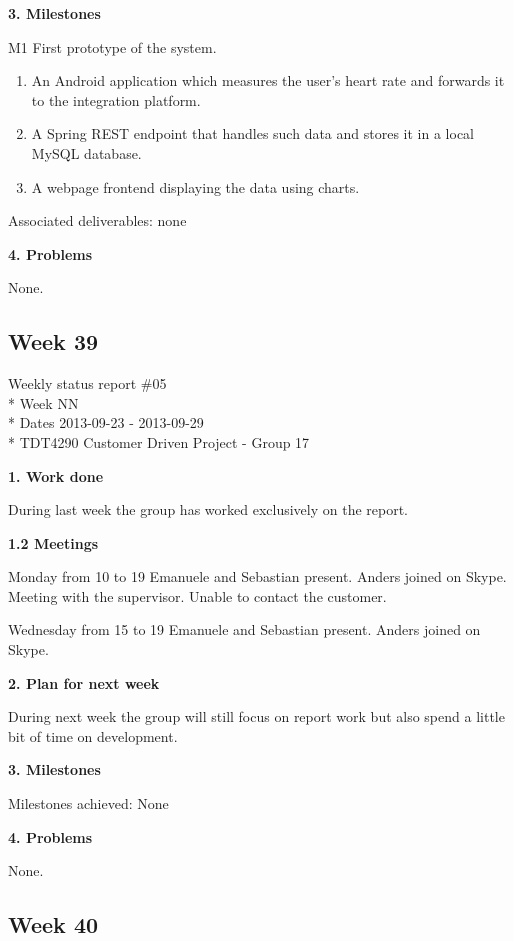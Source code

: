 \textbf{3. Milestones}

M1 First prototype of the system.

\begin{enumerate}
\item An Android application which measures the user’s heart rate and forwards it to the integration platform.
\item A Spring REST endpoint that handles such data and stores it in a local MySQL database.
\item A webpage frontend displaying the data using charts.
\end{enumerate}

Associated deliverables: none


\textbf{4. Problems}

None.


\newpage
\subsection{Week 39}

\begin{center}
Weekly status report \#05\\*
Week NN \\*
Dates 2013-09-23 - 2013-09-29 \\*
TDT4290 Customer Driven Project - Group 17
\end{center}

\textbf{1. Work done}

During last week the group has worked exclusively on the report.

\textbf{1.2 Meetings}

Monday from 10 to 19
Emanuele and Sebastian present. Anders joined on Skype.
Meeting with the supervisor. Unable to contact the customer.

Wednesday from 15 to 19
Emanuele and Sebastian present. Anders joined on Skype.


\textbf{2. Plan for next week}

During next week the group will still focus on report work but also spend a little bit of time on development.

\textbf{3. Milestones}

Milestones achieved: None

\textbf{4. Problems}

None.

\newpage
\subsection{Week 40}

